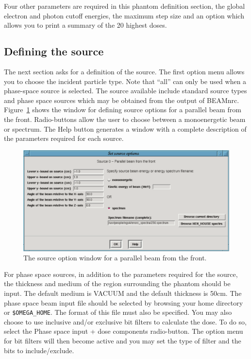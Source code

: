 \documentclass[12pt,twoside]{article}
\begin{document}
Four other
parameters are required in this phantom definition section, the global
electron and photon cutoff energies, the maximum step size and an option
which allows you to print a summary of the 20 highest doses.

\subsection{Defining the source}

The next section asks for a definition of the source.  The first option
menu allows you to choose the incident particle type.  Note that ``all''
can only be used when a phase-space source is selected.  The source
available include standard source types and phase space sources which
may be obtained from
the output of BEAMnrc.  Figure~\ref{xyz_source} shows the window for
defining source options for a parallel beam from the front.
Radio-buttons allow the user to choose between a monoenergetic beam or
spectrum.  The {\sf Help} button generates a window with a
complete description of the parameters required for each source.

\begin{figure}[htb]
\begin{center}
\leavevmode
\includegraphics[width=15cm]{figures/xyz_source}
\end{center}
\caption{The source option window for a parallel beam from the front.\label{xyz_source}}
\end{figure}

For phase space sources, in addition to the parameters required for the
source, the thickness and medium of the region surrounding the phantom
should be input.  The default medium is VACUUM and the default thickness
is 50cm.  The phase space beam input file should be selected by browsing
your home directory or {\tt \$OMEGA\_HOME}.  The format of this file
must also be specified.  You may also choose to use inclusive and/or
exclusive bit filters to calculate the dose.  To do so, select the
{\sf Phase space input + dose components} radio-button.  The option menu
for bit filters will then become active and you may set the type of
filter and the bits to include/exclude.
\end{document}

